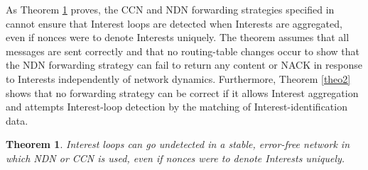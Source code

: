 \documentclass{ancs15-alternate}
\newtheorem{theorem}{Theorem}
\begin{document}
 
As Theorem \ref{theo1} proves,  the CCN and NDN forwarding strategies specified in \cite{ccn, ndn-fw2, ndn-paper} 
cannot ensure that Interest loops are detected  when Interests are aggregated, even if nonces were to denote Interests uniquely. The theorem assumes that all messages are sent correctly and that no routing-table changes occur  to show  that the NDN forwarding strategy can fail to return any content or NACK in response to Interests independently of network dynamics.  Furthermore, Theorem \ref{theo2} shows that no forwarding strategy can be correct if it allows Interest aggregation and attempts  Interest-loop detection by the matching of Interest-identification data.

\begin{theorem}
\label{theo1}
Interest loops can go undetected in a stable, error-free network in which  NDN or CCN  is used, even if nonces were to denote Interests uniquely.
\end{theorem}
\end{document}
